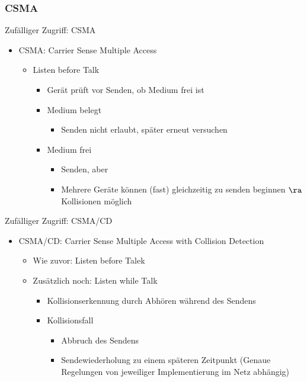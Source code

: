     \subsubsection{CSMA}
      Zufälliger Zugriff: CSMA
      \begin{itemize}
        \item CSMA: Carrier Sense Multiple Access
          \begin{itemize}
            \item Listen before Talk
              \begin{itemize}
                \item Gerät prüft vor Senden, ob Medium frei ist
                \item Medium belegt
                  \begin{itemize}
                    \item Senden nicht erlaubt, später erneut versuchen
                  \end{itemize}
                \item Medium frei
                  \begin{itemize}
                    \item Senden, aber
                    \item Mehrere Geräte können (fast) gleichzeitig zu senden beginnen $\ra$
                      Kollisionen möglich
                  \end{itemize}
              \end{itemize}
          \end{itemize}
      \end{itemize}
      Zufälliger Zugriff: CSMA/CD
      \begin{itemize}
        \item CSMA/CD: Carrier Sense Multiple Access with Collision Detection
          \begin{itemize}
            \item Wie zuvor: Listen before Talek
            \item Zusätzlich noch: Listen while Talk
              \begin{itemize}
                \item Kollisionserkennung durch Abhören während des Sendens
                \item Kollisionsfall
                  \begin{itemize}
                    \item Abbruch des Sendens
                    \item Sendewiederholung zu einem späteren Zeitpunkt (Genaue Regelungen von
                      jeweiliger Implementierung im Netz abhängig)
                  \end{itemize}
              \end{itemize}
          \end{itemize}
      \end{itemize}
